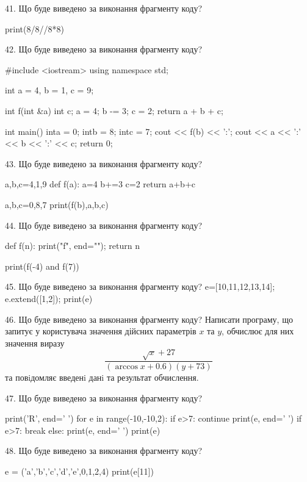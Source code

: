 \documentclass[11pt]{article}
\begin{document}

41. Що буде виведено за виконання фрагменту коду?

print(8/8//8*8)


42. Що буде виведено за виконання фрагменту коду?

#include <iostream>
using namespace std;

int a = 4, b = 1, c = 9;

int f(int &a){
int c;    a = 4;
    b -= 3;
    c = 2;
    return a + b + c;
}

int main(){
    inta = 0;
    intb = 8;
    intc = 7;
    cout << f(b) << ':';
    cout << a << ':' << b << ':' << c;
    return 0; 
}


43. Що буде виведено за виконання фрагменту коду?

a,b,c=4,1,9
def f(a):
    a=4
    b+=3
    c=2
    return a+b+c

a,b,c=0,8,7
print(f(b),a,b,c)


44. Що буде виведено за виконання фрагменту коду?

def f(n):
    print("f", end="");
    return n

print(f(-4) and f(7))


45. Що буде виведено за виконання фрагменту коду?
e=[10,11,12,13,14]; e.extend([1,2]); print(e)

46. Що буде виведено за виконання фрагменту коду?
Написати програму, що запитує у користувача значення дійсних параметрів $x$ та $y$, обчислює для них значення виразу 
$$\frac{\sqrt x + 27}{(\arccos x + 0.6) (y + 73)}$$ 
та повiдомляє введенi данi та результат обчислення.



47. Що буде виведено за виконання фрагменту коду?

print('R', end=' ')
for e in range(-10,-10,2):
    if e>7:
        continue
        print(e, end=' ')
    if e>7:
        break
    else:
        print(e, end=' ')
    print(e)


48. Що буде виведено за виконання фрагменту коду?

e = ('a','b','c','d','e',0,1,2,4)
print(e[11])
\end{document}
